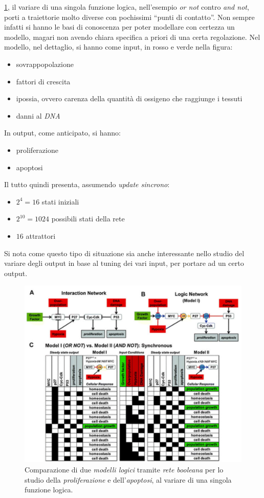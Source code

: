 \documentclass[a4paper,12pt, oneside]{book}
\begin{document}
\ref{fig:exbool2}, il variare di una singola funzione logica, nell'esempio
\textit{or not} contro \textit{and not}, porti a traiettorie molto diverse con
pochissimi ``punti di contatto''. Non sempre infatti si hanno le basi di
conoscenza per poter modellare con certezza un modello, magari non avendo chiara
specifica a priori di una certa regolazione. Nel modello, nel dettaglio, si
hanno come input, in rosso e verde nella figura:
\begin{itemize}
  \item sovrappopolazione
  \item fattori di crescita
  \item ipossia, ovvero carenza della quantità di ossigeno che raggiunge i
  tessuti 
  \item danni al \textit{DNA}
\end{itemize}
In output, come anticipato, si hanno:
\begin{itemize}
  \item proliferazione
  \item apoptosi
\end{itemize}
Il tutto quindi presenta, assumendo \textit{update sincrono}:
\begin{itemize}
  \item $2^4=16$ stati iniziali
  \item $2^{10}=1024$ possibili stati della rete
  \item $16$ attrattori
\end{itemize}
Si nota come questo tipo di situazione sia anche interessante nello studio del
variare degli output in base al tuning dei vari input, per portare ad un certo
output. \\
\begin{figure}
  \centering
  \includegraphics[scale = 0.25]{img/exbool2.jpg}
  \caption{Comparazione di due \textit{modelli logici} tramite \textit{rete
      booleana} per lo studio  della \textit{proliferazione} e
    dell'\textit{apoptosi}, al variare di una singola funzione logica.}  
  \label{fig:exbool2}
\end{figure}
\end{document}
